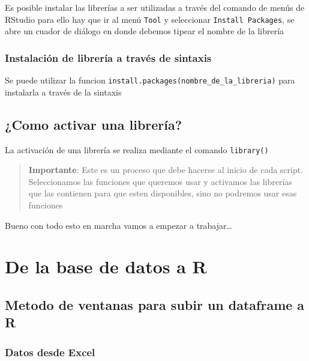 \documentclass[
]{book}
\begin{document}
Es posible instalar las librerías a ser utilizadas a través del comando de menús de RStudio para ello hay que ir al menú \texttt{Tool} y seleccionar \texttt{Install\ Packages}, se abre un cuador de diálogo en donde debemos tipear el nombre de la librería

\hypertarget{instalaciuxf3n-de-libreruxeda-a-travuxe9s-de-sintaxis}{%
\subsubsection{Instalación de librería a través de sintaxis}\label{instalaciuxf3n-de-libreruxeda-a-travuxe9s-de-sintaxis}}

Se puede utilizar la funcion \texttt{install.packages(nombre\_de\_la\_libreria)} para instalarla a través de la sintaxis

\hypertarget{como-activar-una-libreruxeda}{%
\subsection{¿Como activar una librería?}\label{como-activar-una-libreruxeda}}

La activación de una librería se realiza mediante el comando \texttt{library()}

\begin{quote}
\textbf{Importante}: Este es un proceso que debe hacerse al inicio de cada script. Seleccionamos las funciones que queremos usar y activamos las librerías que las contienen para que esten disponibles, sino no podremos usar esas funciones
\end{quote}

Bueno con todo esto en marcha vamos a empezar a trabajar\ldots{}

\hypertarget{de-la-base-de-datos-a-r}{%
\section{De la base de datos a R}\label{de-la-base-de-datos-a-r}}

\hypertarget{metodo-de-ventanas-para-subir-un-dataframe-a-r}{%
\subsection{Metodo de ventanas para subir un dataframe a R}\label{metodo-de-ventanas-para-subir-un-dataframe-a-r}}

\hypertarget{datos-desde-excel}{%
\subsubsection{Datos desde Excel}\label{datos-desde-excel}}
\end{document}
